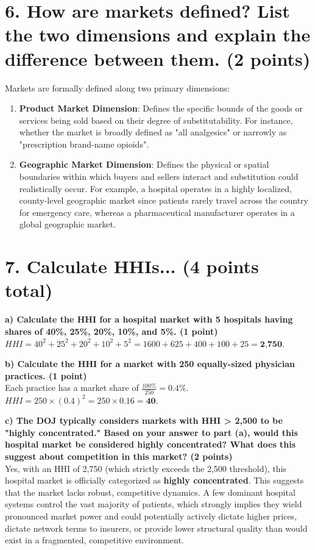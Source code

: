 \documentclass[11pt, letterpaper]{article}
\begin{document}
\section*{6. How are markets defined? List the two dimensions and explain the difference between them. (2 points)}

Markets are formally defined along two primary dimensions:
\begin{enumerate}[leftmargin=*]
    \item \textbf{Product Market Dimension}: Defines the specific bounds of the goods or services being sold based on their degree of substitutability. For instance, whether the market is broadly defined as "all analgesics" or narrowly as "prescription brand-name opioids".
    \item \textbf{Geographic Market Dimension}: Defines the physical or spatial boundaries within which buyers and sellers interact and substitution could realistically occur. For example, a hospital operates in a highly localized, county-level geographic market since patients rarely travel across the country for emergency care, whereas a pharmaceutical manufacturer operates in a global geographic market.
\end{enumerate}

\section*{7. Calculate HHIs... (4 points total)}

\textbf{a) Calculate the HHI for a hospital market with 5 hospitals having shares of 40\%, 25\%, 20\%, 10\%, and 5\%. (1 point)} \\
$HHI = 40^2 + 25^2 + 20^2 + 10^2 + 5^2 = 1600 + 625 + 400 + 100 + 25 = \textbf{2,750}$.

\textbf{b) Calculate the HHI for a market with 250 equally-sized physician practices. (1 point)} \\
Each practice has a market share of $\frac{100\%}{250} = 0.4\%$. \\
$HHI = 250 \times (0.4)^2 = 250 \times 0.16 = \textbf{40}$.

\textbf{c) The DOJ typically considers markets with HHI > 2,500 to be "highly concentrated." Based on your answer to part (a), would this hospital market be considered highly concentrated? What does this suggest about competition in this market? (2 points)} \\
Yes, with an HHI of 2,750 (which strictly exceeds the 2,500 threshold), this hospital market is officially categorized as \textbf{highly concentrated}. This suggests that the market lacks robust, competitive dynamics. A few dominant hospital systems control the vast majority of patients, which strongly implies they wield pronounced market power and could potentially actively dictate higher prices, dictate network terms to insurers, or provide lower structural quality than would exist in a fragmented, competitive environment.
\end{document}

